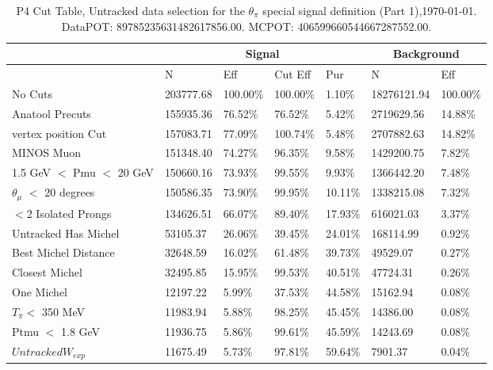 \begin{table}[!hbt]
    \tiny
    \centering
    \begin{tabular}{|*{7}{l|}}

    \hline
    & \multicolumn{4}{c|}{Signal} & \multicolumn{2}{c|}{Background} \\
    \hline
& N     & Eff     & Cut Eff & Pur    & N         & Eff   \\\hline
 No Cuts   & 203777.68 & 100.00\% & 100.00\% &   1.10\% & 18276121.94 & 100.00\%  \\ \hline
 Anatool Precuts & 155935.36 & 76.52\% &  76.52\% &   5.42\% & 2719629.56 &  14.88\% \\ \hline
 vertex position Cut & 157083.71 & 77.09\% & 100.74\% &   5.48\% & 2707882.63 &  14.82\% \\ \hline
 MINOS Muon   & 151348.40 & 74.27\% &  96.35\% &   9.58\% & 1429200.75 &   7.82\%  \\ \hline
 1.5 GeV $<$ Pmu $<$ 20 GeV & 150660.16 &  73.93\% &  99.55\% & 9.93\% & 1366442.20 & 7.48\% \\ \hline
 $\theta_{\mu}$ $<$ 20 degrees & 150586.35 & 73.90\% & 99.95\% &  10.11\% & 1338215.08 & 7.32\% \\ \hline
 $<$2 Isolated Prongs   & 134626.51     &  66.07\% &  89.40\% &  17.93\% & 616021.03 &   3.37\%  \\ \hline
 Untracked Has Michel   & 53105.37     &  26.06\% &  39.45\% &  24.01\% & 168114.99 &   0.92\% \\ \hline
 Best Michel Distance   & 32648.59     &  16.02\% &  61.48\% &  39.73\% & 49529.07 &   0.27\% \\ \hline
 Closest Michel  & 32495.85     &  15.95\% &  99.53\% &  40.51\% & 47724.31 &   0.26\% \\ \hline
 One Michel  & 12197.22 & 5.99\% &  37.53\% &  44.58\% & 15162.94 &   0.08\%  \\ \hline
 $T_\pi<$ 350 MeV & 11983.94   & 5.88\% &  98.25\% &  45.45\% & 14386.00 &   0.08\% \\ \hline
 Ptmu $<$ 1.8 GeV & 11936.75     &   5.86\% &  99.61\% &  45.59\% & 14243.69 &   0.08\% \\ \hline
 $Untracked W_{exp}$ & 11675.49     &   5.73\% &  97.81\% &  59.64\% & 7901.37 &   0.04\%   \\ \hline
    \end{tabular}
    \caption{P4 Cut Table, Untracked data selection for the $\theta_\pi$ special signal definition (Part 1),\today. DataPOT: 89785235631482617856.00. MCPOT: 406599660544667287552.00.}
    \label{tab:Analysis:Cuts:UntrackedCutTableThetapi1}
\end{table}

